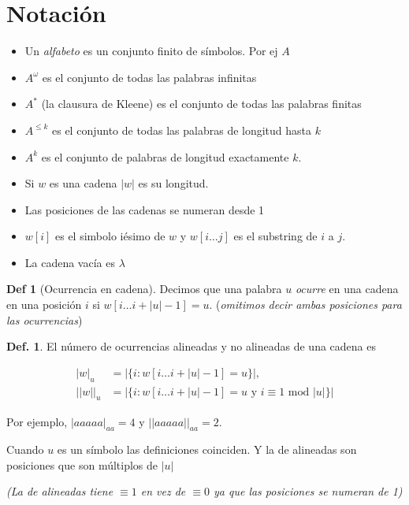 \documentclass{report}
\theoremstyle{definition} %
\newtheorem{definition}{Def.}
\newtheorem*{definition*}{Def}
\begin{document}
\section{Notación}

\begin{itemize}
    \item Un \textit{alfabeto} es un conjunto finito de símbolos. Por ej $A$
    \item $A^\omega$ es el conjunto de todas las palabras infinitas
    \item $A^*$ (la clausura de Kleene) es el conjunto de todas las palabras finitas
    \item $A^{\leq k}$ es el conjunto de todas las palabras de longitud hasta $k$
    \item $A^{k}$ es el conjunto de palabras de longitud exactamente $k$.
    \item Si $w$ es una cadena $|w|$ es su longitud.
    \item Las posiciones de las cadenas se numeran desde 1
    \item $w[i]$ es el simbolo iésimo de $w$ y $w[i\dots j]$ es el substring de
    $i$ a $j$.
    \item La cadena vacía es $\lambda$
\end{itemize}

\begin{definition*}[Ocurrencia en cadena]
    Decimos que una palabra $u$ \textit{ocurre} en una cadena en una posición
    $i$ si $w[i\dots i+|u|-1] = u$. (\textit{omitimos decir ambas posiciones
    para las ocurrencias})
\end{definition*}

\begin{definition}
    El número de ocurrencias alineadas y no alineadas de una cadena es

    \begin{align*}
        |w|_u &= |\{ i : w[i\dots i+|u| - 1] = u\}|,\\
        ||w||_u &= |\{ i : w[i\dots i+|u| - 1] = u \text{ y } i \equiv 1 \text{ mod } |u|\}|
    \end{align*}

    Por ejemplo, $|aaaaa|_{aa} = 4$ y $||aaaaa||_{aa} = 2$.

    Cuando $u$ es un símbolo las definiciones coinciden. Y la de alineadas son
    posiciones que son múltiplos de $|u|$

    \textit{(La de alineadas tiene $\equiv 1$ en vez de $\equiv 0$ ya que las posiciones se numeran de 1)}
\end{definition}
\end{document}

